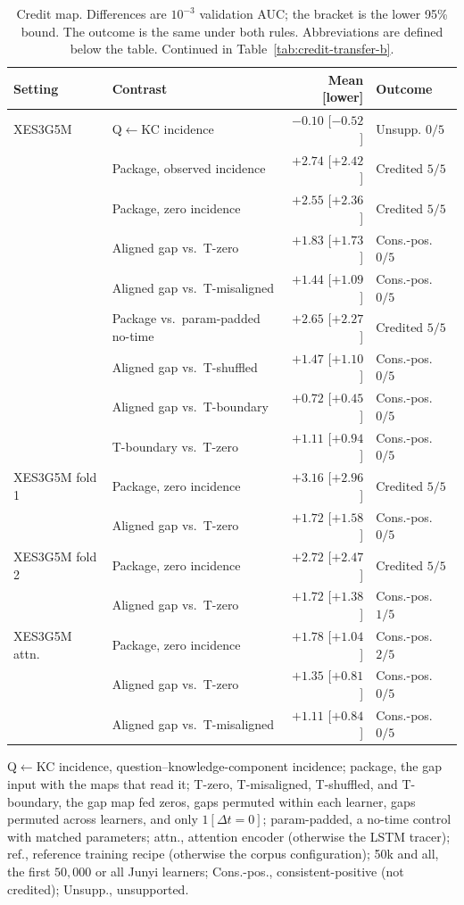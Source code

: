\begin{table}[tbp]
\caption{Credit map. Differences are $10^{-3}$ validation AUC; the
bracket is the lower 95\% bound. The outcome is the same under both
rules. Abbreviations are defined below the table. Continued in Table~\ref{tab:credit-transfer-b}.}
\label{tab:credit-transfer}
\centering
\scriptsize
\setlength{\tabcolsep}{3pt}
\renewcommand{\arraystretch}{0.84}
\begin{tabular}{@{}llrl@{}}
\toprule
Setting & Contrast & Mean [lower] & Outcome \\
\midrule
XES3G5M & Q$\leftarrow$KC incidence & $-0.10$ [$-0.52$] & Unsupp. $0/5$ \\
 & Package, observed incidence & $+2.74$ [$+2.42$] & Credited $5/5$ \\
 & Package, zero incidence & $+2.55$ [$+2.36$] & Credited $5/5$ \\
 & Aligned gap vs.\ T-zero & $+1.83$ [$+1.73$] & Cons.-pos. $0/5$ \\
 & Aligned gap vs.\ T-misaligned & $+1.44$ [$+1.09$] & Cons.-pos. $0/5$ \\
 & Package vs.\ param-padded no-time & $+2.65$ [$+2.27$] & Credited $5/5$ \\
 & Aligned gap vs.\ T-shuffled & $+1.47$ [$+1.10$] & Cons.-pos. $0/5$ \\
 & Aligned gap vs.\ T-boundary & $+0.72$ [$+0.45$] & Cons.-pos. $0/5$ \\
 & T-boundary vs.\ T-zero & $+1.11$ [$+0.94$] & Cons.-pos. $0/5$ \\
\addlinespace[1pt]
XES3G5M fold 1 & Package, zero incidence & $+3.16$ [$+2.96$] & Credited $5/5$ \\
 & Aligned gap vs.\ T-zero & $+1.72$ [$+1.58$] & Cons.-pos. $0/5$ \\
\addlinespace[1pt]
XES3G5M fold 2 & Package, zero incidence & $+2.72$ [$+2.47$] & Credited $5/5$ \\
 & Aligned gap vs.\ T-zero & $+1.72$ [$+1.38$] & Cons.-pos. $1/5$ \\
\addlinespace[1pt]
XES3G5M attn. & Package, zero incidence & $+1.78$ [$+1.04$] & Cons.-pos. $2/5$ \\
 & Aligned gap vs.\ T-zero & $+1.35$ [$+0.81$] & Cons.-pos. $0/5$ \\
 & Aligned gap vs.\ T-misaligned & $+1.11$ [$+0.84$] & Cons.-pos. $0/5$ \\
\bottomrule
\end{tabular}

\smallskip
\parbox{0.92\linewidth}{\scriptsize
Q$\leftarrow$KC incidence, question--knowledge-component incidence;
package, the gap input with the maps that read it; T-zero,
T-misaligned, T-shuffled, and T-boundary, the gap map fed zeros, gaps
permuted within each learner, gaps permuted across learners, and only
$1[\Delta t{=}0]$; param-padded, a no-time control with matched
parameters; attn., attention encoder (otherwise the LSTM tracer); ref.,
reference training recipe (otherwise the corpus configuration); 50k
and all, the first $50{,}000$ or all Junyi learners; Cons.-pos.,
consistent-positive (not credited); Unsupp., unsupported.
}
\end{table}

